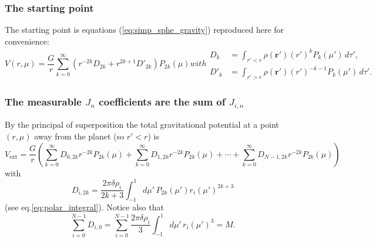 \documentclass[amsmath,amsfonts,rmp,letterpaper]{revtex4}
\newcommand{\V}[1]{\mathbf{#1}} %
\newcommand{\sub}[1]{_{\text{#1}}} %
\newcommand{\arp}{\V{r'}}
\renewcommand{\inf}{\infty}
\newcommand{\ptk}{P_{2k}}
\newcommand{\sumonk}{\sum_{k=0}^{\inf}}
\newcommand{\sumoni}{\sum_{i=0}^{N-1}}
\newcommand{\dro}{\delta\rho}
\newcommand{\intonmu}{\int_{-1}^{1}}
\begin{document}
\subsubsection{The starting point}
The starting point is equations (\ref{eq:simp_sphe_gravity}) reproduced here for
convenience:
\begin{subequations}
\begin{equation}
V(r,\mu)=\frac{G}{r}\sum_{k=0}^{\infty}\left(r^{-2k}D_{2k} +
r^{2k + 1}D'_{2k}\right)P_{2k}(\mu)
\end{equation}
with
\begin{align}
D_k &= \int_{r'<r}\rho(\arp)(r')^kP_k(\mu')\,d\tau',\\
D'_k &= \int_{r'>r}\rho(\arp)(r')^{-k-1}P_k(\mu')\,d\tau'.
\end{align}
\end{subequations}

\subsubsection{The measurable $J_n$ coefficients are the sum of $J_{i,n}$}
By the principal of superposition the total gravitational potential at a point
$(r,\mu)$ away from the planet (so $r'<r$) is
\begin{equation}
V\sub{ext} = \frac{G}{r}\left(\sum_{k=0}^{\inf}D_{0,2k}r^{-2k}P_{2k}(\mu) + 
\sum_{k=0}^{\inf}D_{1,2k}r^{-2k}\ptk(\mu) + \cdots + 
\sumonk{}D_{N-1,2k}r^{-2k}\ptk(\mu) \right)
\end{equation}
with
\begin{equation}
D_{i,2k} = \frac{2\pi\dro_i}{2k + 3}
\int_{-1}^{1}d\mu'\,\ptk(\mu')r_i(\mu')^{2k + 3}
\end{equation}
(see eq.\eqref{eq:polar_integral}). Notice also that
\begin{equation}\label{eq:M_is_sum_on_D0}
\sum_{i=0}^{N-1}D_{i,0} = \sumoni\frac{2\pi\dro_i}{3}\intonmu{d}\mu'\,r_i(\mu')^3
= M.
\end{equation}
\end{document}
